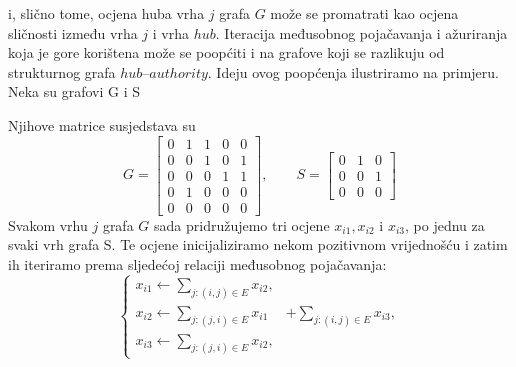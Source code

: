 \documentclass[12pt, letterpaper]{article}
\numberwithin{figure}{section}
\begin{document}
i, slično tome, ocjena huba vrha $j$ grafa $G$ može se promatrati kao ocjena sličnosti između vrha $j$ i vrha $\mathit{hub}$. Iteracija međusobnog pojačavanja i ažuriranja koja je gore korištena može se poopćiti i na grafove koji se razlikuju od strukturnog grafa $\mathit{hub}\text{--}\mathit{authority}$. Ideju ovog poopćenja ilustriramo na primjeru. 
Neka su grafovi G i S

\hspace{2cm}
\hspace{2cm}

Njihove matrice susjedstava su
\[
G =
\begin{bmatrix}
0 & 1 & 1 & 0 & 0 \\
0 & 0 & 1 & 0 & 1 \\
0 & 0 & 0 & 1 & 1 \\
0 & 1 & 0 & 0 & 0 \\
0 & 0 & 0 & 0 & 0
\end{bmatrix},
\qquad
S =
\begin{bmatrix}
0 & 1 & 0 \\
0 & 0 & 1 \\
0 & 0 & 0
\end{bmatrix}
\]
Svakom vrhu $j$ grafa $G$ sada pridružujemo tri ocjene $x_{i1}, x_{i2}$ i $x_{i3}$, po jednu za svaki vrh grafa S. Te ocjene inicijaliziramo nekom pozitivnom vrijednošću i zatim ih iteriramo prema sljedećoj relaciji međusobnog pojačavanja:
\[
\begin{cases}
x_{i1} \leftarrow \sum_{j:(i,j)\in E} x_{i2}, \\
x_{i2} \leftarrow \sum_{j:(j,i)\in E} x_{i1} & + \sum_{j:(i,j)\in E} x_{i3}, \\
x_{i3} \leftarrow \sum_{j:(j,i)\in E} x_{i2},
\end{cases}
\]
\end{document}
